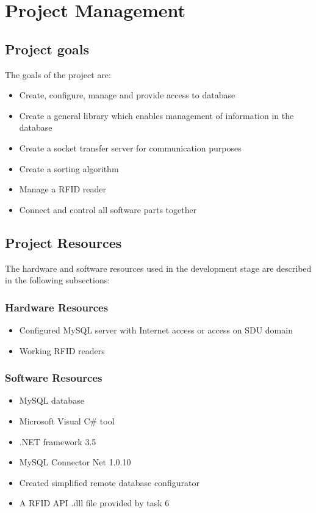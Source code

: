 %
\section{Project Management}

\subsection{Project goals}

The goals of the project are:

\begin{itemize}
	\item Create, configure, manage and provide access to database
	\item Create a general library which enables management of information in the database
	\item Create a socket transfer server for communication purposes
	\item Create a sorting algorithm
	\item Manage a RFID reader
	\item Connect and control all software parts together
\end{itemize}

\subsection{Project Resources}

The hardware and software resources used in the development stage are described in the following subsections:

\subsubsection{Hardware Resources}
\begin{itemize}
	\item Configured MySQL server with Internet access or access on SDU domain
	\item Working RFID readers
\end{itemize}

\subsubsection{Software Resources}
\begin{itemize}
	\item MySQL database
	\item Microsoft Visual C\# tool
	\item .NET framework 3.5
	\item MySQL Connector Net 1.0.10
	\item Created simplified remote database configurator
	\item A RFID API .dll file provided by task 6
\end{itemize}

